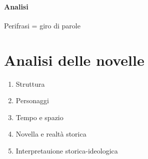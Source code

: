 \documentclass[a4paper]{article}
\begin{document}
\phantom{ }\vspace{0.1cm}

\paragraph{Analisi}

Perifrasi = giro di parole

\section{Analisi delle novelle}

\begin{enumerate}
    \item Struttura
    \item Personaggi
    \item Tempo e spazio
    \item Novella e realtà storica
    \item Interpretauione storica-ideologica
\end{enumerate}
\end{document}
